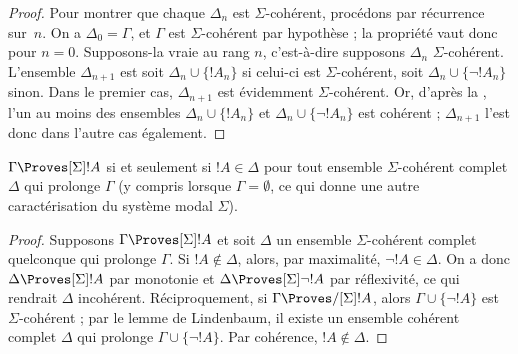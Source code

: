 \documentclass[../../../include/open-logic-section]{subfiles}
\begin{document}
\begin{proof}
Pour montrer que chaque $\Delta_n$ est $\Sigma$-cohérent, procédons
par récurrence sur~$n$. On a $\Delta_0 = \Gamma$, et $\Gamma$ est
$\Sigma$-cohérent par hypothèse ; la propriété vaut donc pour $n = 0$.
Supposons-la vraie au rang $n$, c'est-à-dire supposons $\Delta_n$
$\Sigma$-cohérent. L'ensemble $\Delta_{n+1}$ est soit
$\Delta_n \cup \{!A_n\}$ si celui-ci est $\Sigma$-cohérent, soit
$\Delta_n \cup \{\lnot!A_n\}$ sinon. Dans le premier cas,
$\Delta_{n+1}$ est évidemment $\Sigma$-cohérent. Or, d'après la
,
l'un au moins des ensembles $\Delta_n \cup \{!A_n\}$ et
$\Delta_n \cup \{\lnot!A_n\}$ est cohérent ; $\Delta_{n+1}$ l'est
donc dans l'autre cas également.
\end{proof}

\begin{cor}
  $\Gamma \Proves[\Sigma] !A$ si et seulement si $!A \in \Delta$ pour
  tout ensemble $\Sigma$-cohérent complet $\Delta$ qui prolonge
  $\Gamma$ (y compris lorsque $\Gamma = \emptyset$, ce qui donne une
  autre caractérisation du système modal $\Sigma$).
\end{cor}

\begin{proof}
  Supposons $\Gamma \Proves[\Sigma] !A$ et soit $\Delta$ un ensemble
  $\Sigma$-cohérent complet quelconque qui prolonge $\Gamma$. Si $!A
  \notin \Delta$, alors, par maximalité, $\lnot!A \in \Delta$. On a
  donc $\Delta \Proves[\Sigma] !A$ par monotonie et $\Delta
  \Proves[\Sigma] \lnot!A$ par réflexivité, ce qui rendrait $\Delta$
  incohérent. Réciproquement, si $\Gamma \Proves/[\Sigma] !A$, alors
  $\Gamma \cup \{ \lnot!A\}$ est $\Sigma$-cohérent ; par le lemme de
  Lindenbaum, il existe un ensemble cohérent complet $\Delta$ qui
  prolonge $\Gamma \cup \{ \lnot!A \}$. Par cohérence, $!A
  \notin \Delta$.
\end{proof}
\end{document}
